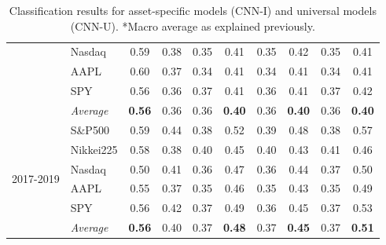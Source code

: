\documentclass[11pt, a4paper]{article}
\begin{document}
\begin{table}[H]
\begin{tabular}{l|l|cc|cc|cc|cc}
          & Nasdaq           & 0.59          & 0.38 & 0.35 & 0.41          & 0.35 & 0.42          & 0.35 & 0.41          \\
          & AAPL             & 0.60          & 0.37 & 0.34 & 0.41          & 0.34 & 0.41          & 0.34 & 0.41          \\
          & SPY              & 0.56          & 0.36 & 0.37 & 0.41          & 0.36 & 0.41          & 0.37 & 0.42          \\ \cline{2-10} 
          & \textit{Average} & \textbf{0.56} & 0.36 & 0.36 & \textbf{0.40} & 0.36 & \textbf{0.40} & 0.36 & \textbf{0.40} \\ \hline
\multirow{6}{1cm}{2017-2019} & S\&P500          & 0.59          & 0.44 & 0.38 & 0.52          & 0.39 & 0.48          & 0.38 & 0.57          \\
& Nikkei225        & 0.58          & 0.38 & 0.40 & 0.45          & 0.40 & 0.43          & 0.41 & 0.46          \\
& Nasdaq           & 0.50          & 0.41 & 0.36 & 0.47          & 0.36 & 0.44          & 0.37 & 0.50          \\
& AAPL             & 0.55          & 0.37 & 0.35 & 0.46          & 0.35 & 0.43          & 0.35 & 0.49          \\
& SPY              & 0.56          & 0.42 & 0.37 & 0.49          & 0.36 & 0.45          & 0.37 & 0.53          \\ \cline{2-10}
& \textit{Average} & \textbf{0.56} & 0.40 & 0.37 & \textbf{0.48} & 0.37 & \textbf{0.45} & 0.37 & \textbf{0.51}
\end{tabular}
\caption{Classification results for asset-specific models (CNN-I) and universal models (CNN-U). *Macro average as explained previously.}
\label{tbl:ClassRes}
\end{table}
\end{document}
